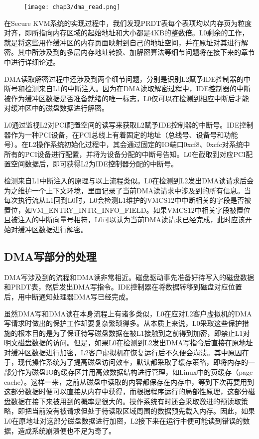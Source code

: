 \begin{figure}[!htbp]
  \centering
  \texttt{[image: chap3/dma\_read.png]}
\end{figure}

在Secure KVM系统的实现过程中，我们发现PRDT表每个表项均以内存页为粒度对齐，即所指向内存区域的起始地址和大小都是4KB的整数倍。L0剩余的工作，就是将这些用作缓冲区的内存页面映射到自己的地址空间，并在原址对其进行解密。其中所涉及到的多层内存地址转换、加解密算法等细节问题将在接下来的章节中进行详细论述。

DMA读取解密过程中还涉及到两个细节问题，分别是识别L2赋予IDE控制器的中断号和检测来自L1的中断注入。因为在DMA读取解密过程中，IDE控制器的中断被作为缓冲区数据是否准备就绪的唯一标志，L0仅可以在检测到相应中断后才能对缓冲区中的磁盘数据进行解密。

L0通过监视L2对PCI配置空间的读写来获取L2赋予IDE控制器的中断号。IDE控制器作为一种PCI设备，在PCI总线上有着固定的地址（总线号、设备号和功能号）。在L2操作系统初始化过程中，其会通过固定的IO端口0xcf8、0xcfc对系统中所有的PCI设备进行配置，并将为设备分配的中断号告知。L0在截取到对应PCI配置空间数据后，即可获得L2为IDE控制器分配的中断号。

检测来自L1中断注入的原理与以上流程类似。L0在检测到L2发出DMA读请求后会为之维护一个上下文环境，里面记录了当前DMA读请求中涉及到的所有信息。当每次执行流从L1回到L0时，L0会检测L1维护的VMCS12中中断相关的字段是否被置位，如VM\_ENTRY\_INTR\_INFO\_FIELD。如果VMCS12中相关字段被置位且被注入的中断向量号相符，L0可以认为当前DMA读请求已经完成，此时应该开始对缓冲区数据进行解密。

\subsection{DMA写部分的处理}

DMA写涉及到的流程和DMA读非常相近。磁盘驱动事先准备好待写入的磁盘数据和PRDT表，然后发出DMA写指令。IDE控制器在将数据转移到磁盘对应位置后，用中断通知处理器DMA写已经完成。

虽然DMA写和DMA读在本身流程上有诸多类似，L0在应对L2客户虚拟机的DMA写请求时做出的保护工作却要复杂繁琐得多。从本质上来说，L0采取这些保护措施的根本目的是为了保证待写磁盘数据在被L1接触到之前得到加密，即禁止L1对明文磁盘数据的访问。但是，如果L0在检测到L2发出DMA写指令后直接在原地址对缓冲区数据进行加密，L2客户虚拟机在恢复运行后不久便会崩溃。其中原因在于，现代操作系统为了提高磁盘访问效率，默认都采取了缓存策略，即将内存的一部分作为磁盘IO的缓存区并用高效数据结构进行管理，如Linux中的页缓存（page cache）。这样一来，之前从磁盘中读取的内容都保存在内存中，等到下次再要用到这部分数据时便可以直接从内存中获得，而根据程序运行的局部性原理，这部分磁盘数据在接下来被用到的概率是很大的。操作系统有时还会采取激进的预读取策略，即把当前没有被请求但处于待读取区域周围的数据预先载入内存。因此，如果L0在原地址对这部分磁盘数据进行加密，L2接下来在运行中便可能读到错误的数据，造成系统崩溃便也不足为奇了。

